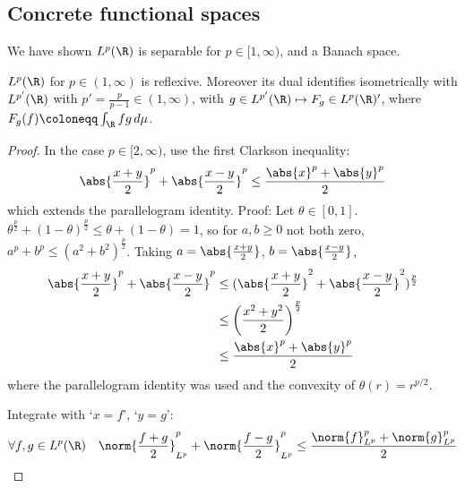 \documentclass[twoside]{article}
\begin{document}
\subsection{Concrete functional spaces}
We have shown $L^p(\R)$ is separable for $p \in [1, \infty)$, and a Banach space.
\begin{thm}
    $L^p(\R)$ for $p \in (1, \infty)$ is reflexive.
    Moreover its dual identifies isometrically with $L^{p'}(\R)$ with $p' = \frac{p}{p-1} \in (1, \infty)$, with $g \in L^{p'}(\R) \mapsto F_g \in L^p(\R)'$, where $F_g(f) \coloneqq \int_\R f g \, d\mu$.
\end{thm}
\begin{proof}
    In the case $p \in [2,\infty)$, use the first Clarkson inequality:
    \begin{equation*}
        \abs{\frac{x+y}{2}}^p + \abs{\frac{x-y}{2}}^p \leq \frac{\abs{x}^p + \abs{y}^p}{2}
    \end{equation*}
    which extends the parallelogram identity.
    Proof:
    Let $\theta \in [0, 1]$. $\theta^{\frac{p}{2}} + (1-\theta)^{\frac{p}{2}} \leq \theta + (1-\theta) = 1$, so for $a, b \geq 0$ not both zero, $a^p + b^p \leq (a^2 + b^2)^{\frac{p}{2}}$.
    Taking $a = \abs{\frac{x+y}{2}}$, $b = \abs{\frac{x-y}{2}}$,
    \begin{align*}
        \abs{\frac{x+y}{2}}^p + \abs{\frac{x-y}{2}}^p &\leq (\abs{\frac{x+y}{2}}^2 + \abs{\frac{x-y}{2}}^2)^{\frac{p}{2}} \\
                                                      &\leq \left(\frac{x^2+y^2}{2}\right)^{\frac{p}{2}} \\
                                                      &\leq \frac{\abs{x}^p + \abs{y}^p}{2} \\
    \end{align*}
    where the parallelogram identity was used and the convexity of $\theta(r) = r^{p/2}$.

    Integrate with `$x=f$', `$y=g$':
    \begin{equation*}
        \forall f, g \in L^p(\R) \quad \norm{\frac{f+g}{2}}^p_{L^p} + \norm{\frac{f-g}{2}}^p_{L^p} \leq \frac{\norm{f}^p_{L^p} + \norm{g}^p_{L^p}}{2}
    \end{equation*}
\end{proof}
\end{document}
